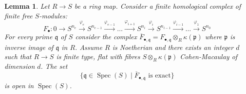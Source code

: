 \documentclass[10pt,a4paper]{amsart}
\theoremstyle{plain}
\newtheorem{lemma}[subsection]{Lemma}
\theoremstyle{definition}
\theoremstyle{remark}
\numberwithin{equation}{subsection}
\def\Spec{\mathop{\mathrm{Spec}}}
\begin{document}
\begin{lemma}
\label{lemma-exact-on-fibres-open}
Let $R \to S$ be a ring map. Consider a finite homological complex of
finite free $S$-modules:
$$
F_{\bullet} :
0
\to
S^{n_e}
\xrightarrow{\varphi_e}
S^{n_{e-1}}
\xrightarrow{\varphi_{e-1}}
\ldots
\xrightarrow{\varphi_{i + 1}}
S^{n_i}
\xrightarrow{\varphi_i}
S^{n_{i-1}}
\xrightarrow{\varphi_{i-1}}
\ldots
\xrightarrow{\varphi_1}
S^{n_0}
$$
For every prime $\mathfrak q$ of $S$ consider the
complex $\overline{F}_{\bullet, \mathfrak q} =
F_{\bullet, \mathfrak q} \otimes_R \kappa(\mathfrak p)$
where $\mathfrak p$ is inverse image of $\mathfrak q$ in $R$.
Assume $R$ is Noetherian and there exists an integer $d$ such
that $R \to S$ is finite type, flat
with fibres $S \otimes_R \kappa(\mathfrak p)$
Cohen-Macaulay of dimension $d$.
The set
$$
\{\mathfrak q \in \Spec(S) \mid
\overline{F}_{\bullet, \mathfrak q}\text{ is exact}\}
$$
is open in $\Spec(S)$.
\end{lemma}
\end{document}
